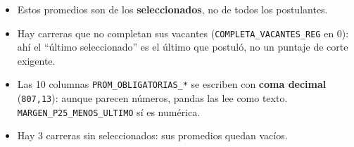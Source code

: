 \documentclass[10.5pt]{article}
\begin{document}
\begin{alertabox}
\begin{itemize}[leftmargin=1.1em,itemsep=2pt,topsep=2pt]
\item Estos promedios son de los \textbf{seleccionados}, no de todos los postulantes.
\item Hay carreras que no completan sus vacantes (\texttt{COMPLETA\_\allowbreak{}VACANTES\_\allowbreak{}REG} en 0): ahí el ``último seleccionado'' es el último que postuló, no un puntaje de corte exigente.
\item Las 10 columnas \texttt{PROM\_\allowbreak{}OBLIGATORIAS\_\allowbreak{}*} se escriben con \textbf{coma decimal} (\texttt{807,13}): aunque parecen números, pandas las lee como texto. \texttt{MARGEN\_\allowbreak{}P25\_\allowbreak{}MENOS\_\allowbreak{}ULTIMO} sí es numérica.
\item Hay 3 carreras sin seleccionados: sus promedios quedan vacíos.
\end{itemize}
\end{alertabox}

\newpage
{}\label{base3}\hypertarget{base3}{}
\end{document}
